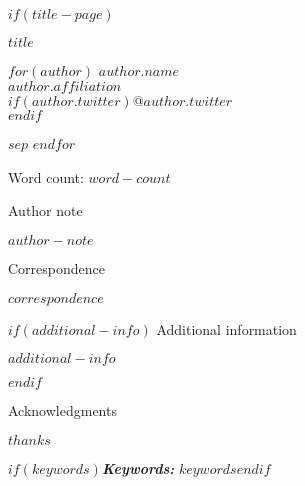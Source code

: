 \documentclass[letterpaper,12pt]{article}
\providecommand{\keywords}[1]{\textbf{\textit{Keywords:}} #1}
\begin{document}
$if(title-page)$

\begin{titlepage}
\center

\vspace*{0.5in}
{\bfseries $title$}

\vspace{\baselineskip}

$for(author)$
$author.name$ \\
$author.affiliation$ \\
$if(author.twitter)$@$author.twitter$ \\$endif$

$sep$ \vspace{\baselineskip}
$endfor$

\vspace{0.25in}

{\center Word count: $word-count$}

\vspace{0.5in}

{\center Author note}

\begin{flushleft}
$author-note$
\end{flushleft}

{\center Correspondence}

\begin{flushleft}
$correspondence$
\end{flushleft}

$if(additional-info)$
{\center Additional information}

\begin{flushleft}
$additional-info$
\end{flushleft}
$endif$

{\center Acknowledgments}

\begin{flushleft}
$thanks$
\end{flushleft}

\vfill  %

\end{titlepage}

\doublespacing

\begin{abstract}
\noindent $abstract$
\end{abstract}

\vspace{\baselineskip}

$if(keywords)$\indent \keywords{$keywords$}$endif$
\end{document}
